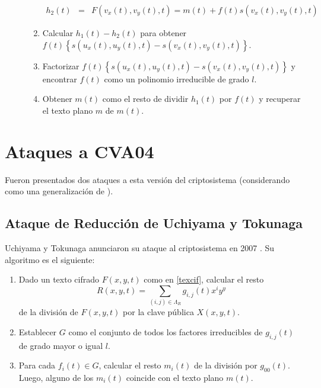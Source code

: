 \documentclass[11pt]{article}
\newcommand{\izq}{\left\{ }
\newcommand{\der}{\right\} }
\numberwithin{equation}{section} %
\numberwithin{figure}{section} %
\numberwithin{table}{section} %
\begin{document}
\begin{description}
\begin{enumerate}
\begin{eqnarray}
						h_2(t)&=&F(v_x(t),v_y(t),t)=m(t)+f(t)s(v_x(t),v_y(t),t)\nonumber
					\end{eqnarray}
					\item Calcular $h_1(t)-h_2(t)$ para obtener $f(t)\izq s(u_x(t),u_y(t),t)-s(v_x(t),v_y(t),t)\der$.%
					\item Factorizar $f(t)\izq s(u_x(t),u_y(t),t)-s(v_x(t),v_y(t),t)\der$ y encontrar $f(t)$ como un polinomio irreducible de grado $l$.%
					\item Obtener $m(t)$ como el resto de dividir $h_1(t)$ por $f(t)$ y recuperar el texto plano $m$ de $m(t)$.%
				\end{enumerate}%
			\end{description}%


	\section{Ataques a CVA04}

		Fueron presentados dos ataques a esta versi\'on del criptosistema (considerando \cite{Iw08} como una generalizaci\'on de \cite{UT}).

		\subsection{Ataque de Reducci\'on de Uchiyama y Tokunaga}
		\label{31UchiToku}

			Uchiyama y Tokunaga anunciaron su ataque al criptosistema en 2007 \cite{UT}. Su algoritmo es el siguiente:

			\begin{enumerate}
				\item Dado un texto cifrado $F(x,y,t)$ como en \ref{texcif}, calcular el resto
					$$
						R(x,y,t)=\sum_{(i,j)\in\Lambda_R}g_{i,j}(t)x^iy^y
					$$
					de la divisi\'on de $F(x,y,t)$ por la clave p\'ublica $X(x,y,t)$.
				\item Establecer $G$ como el conjunto de todos los factores irreducibles de $g_{i,j}(t)$ de grado mayor o igual $l$.
				\item Para cada $f_i(t)\in G$, calcular el resto $m_i(t)$ de la divisi\'on por $g_{00}(t)$. Luego, alguno de los $m_i(t)$ coincide con el texto plano $m(t)$.
			\end{enumerate}
\end{document}
